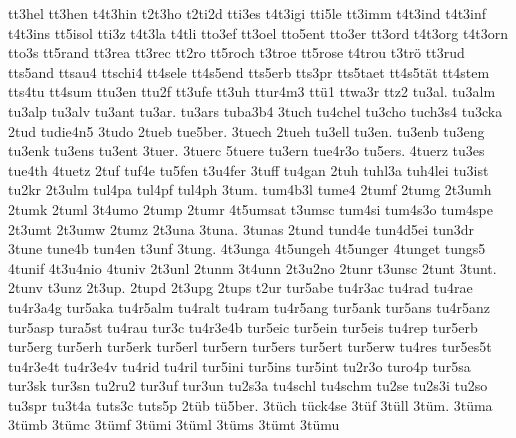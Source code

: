 {    tt3hel
    tt3hen
    t4t3hin
    t2t3ho
    t2ti2d
    tti3es
    t4t3igi
    tti5le
    tt3imm
    t4t3ind
    t4t3inf
    t4t3ins
    tt5isol
    tti3z
    t4t3la
    t4tli
    tto3ef
    tt3oel
    tto5ent
    tto3er
    tt3ord
    t4t3org
    t4t3orn
    tto3s
    tt5rand
    tt3rea
    tt3rec
    tt2ro
    tt5roch
    t3troe
    tt5rose
    t4trou
    t3trö
    tt3rud
    tts5and
    ttsau4
    ttschi4
    tt4sele
    tt4s5end
    tts5erb
    tts3pr
    tts5taet
    tt4s5tät
    tt4stem
    tts4tu
    tt4sum
    ttu3en
    ttu2f
    tt3ufe
    tt3uh
    ttur4m3
    ttü1
    ttwa3r
    ttz2
    tu3al.
    tu3alm
    tu3alp
    tu3alv
    tu3ant
    tu3ar.
    tu3ars
    tuba3b4
    3tuch
    tu4chel
    tu3cho
    tuch3s4
    tu3cka
    2tud
    tudie4n5
    3tudo
    2tueb
    tue5ber.
    3tuech
    2tueh
    tu3ell
    tu3en.
    tu3enb
    tu3eng
    tu3enk
    tu3ens
    tu3ent
    3tuer.
    3tuerc
    5tuere
    tu3ern
    tue4r3o
    tu5ers.
    4tuerz
    tu3es
    tue4th
    4tuetz
    2tuf
    tuf4e
    tu5fen
    t3u4fer
    3tuff
    tu4gan
    2tuh
    tuhl3a
    tuh4lei
    tu3ist
    tu2kr
    2t3ulm
    tul4pa
    tul4pf
    tul4ph
    3tum.
    tum4b3l
    tume4
    2tumf
    2tumg
    2t3umh
    2tumk
    2tuml
    3t4umo
    2tump
    2tumr
    4t5umsat
    t3umsc
    tum4si
    tum4s3o
    tum4spe
    2t3umt
    2t3umw
    2tumz
    2t3una
    3tuna.
    3tunas
    2tund
    tund4e
    tun4d5ei
    tun3dr
    3tune
    tune4b
    tun4en
    t3unf
    3tung.
    4t3unga
    4t5ungeh
    4t5unger
    4tunget
    tungs5
    4tunif
    4t3u4nio
    4tuniv
    2t3unl
    2tunm
    3t4unn
    2t3u2no
    2tunr
    t3unsc
    2tunt
    3tunt.
    2tunv
    t3unz
    2t3up.
    2tupd
    2t3upg
    2tups
    t2ur
    tur5abe
    tu4r3ac
    tu4rad
    tu4rae
    tu4r3a4g
    tur5aka
    tu4r5alm
    tu4ralt
    tu4ram
    tu4r5ang
    tur5ank
    tur5ans
    tu4r5anz
    tur5asp
    tura5st
    tu4rau
    tur3c
    tu4r3e4b
    tur5eic
    tur5ein
    tur5eis
    tu4rep
    tur5erb
    tur5erg
    tur5erh
    tur5erk
    tur5erl
    tur5ern
    tur5ers
    tur5ert
    tur5erw
    tu4res
    tur5es5t
    tu4r3e4t
    tu4r3e4v
    tu4rid
    tu4ril
    tur5ini
    tur5ins
    tur5int
    tu2r3o
    turo4p
    tur5sa
    tur3sk
    tur3sn
    tu2ru2
    tur3uf
    tur3un
    tu2s3a
    tu4schl
    tu4schm
    tu2se
    tu2s3i
    tu2so
    tu3spr
    tu3t4a
    tuts3c
    tuts5p
    2tüb
    tü5ber.
    3tüch
    tück4se
    3tüf
    3tüll
    3tüm.
    3tüma
    3tümb
    3tümc
    3tümf
    3tümi
    3tüml
    3tüms
    3tümt
    3tümu
}

